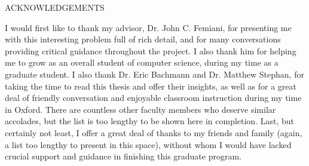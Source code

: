\documentclass[12pt, oneside]{book2}
\def\Advisor{John C. Femiani}
\def\ReaderOne{Eric Bachmann}
\def\ReaderTwo{Matthew Stephan}
\begin{document}
\if@xetex
	\cleardoublepage
\else
	\ifpdf
		\cleardoublepage
	\else
		\cleardoublepage
	\fi
\fi

\setcounter{page}{2}
\tableofcontents
\setcounter{tocdepth}{2}
\listoffigures

\newpage

\begin{center} ACKNOWLEDGEMENTS \end{center}

\noindent I would first like to thank my advisor, Dr. \Advisor{}, for presenting me with this interesting problem full of rich detail, and for many conversations providing critical guidance throughout the project. I also thank him for helping me to grow as an overall student of computer science, during my time as a graduate student. I also thank Dr. \ReaderOne{} and Dr. \ReaderTwo{}, for taking the time to read this thesis and offer their insights, as well as for a great deal of friendly conversation and enjoyable classroom instruction during my time in Oxford. There are countless other faculty members who deserve similar accolades, but the list is too lengthy to be shown here in completion. Last, but certainly not least, I offer a great deal of thanks to my friends and family (again, a list too lengthy to present in this space), without whom I would have lacked crucial support and guidance in finishing this graduate program.

\mainmatter







%

% 
% 
% 
% 

\backmatter



\end{document}
